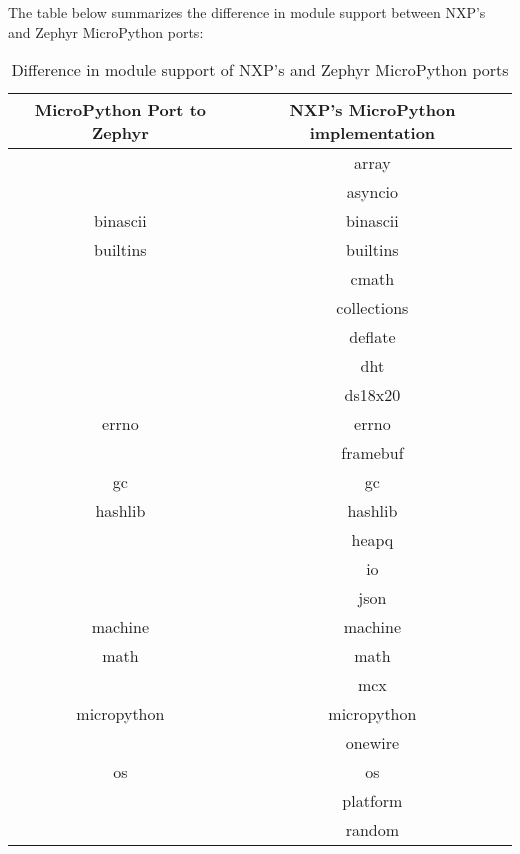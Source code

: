 \documentclass[twoside, 12pt]{article}
\begin{document}
The table below summarizes the difference in module support between NXP's and Zephyr MicroPython ports:

\begin{table}[H]
\centering
\caption{Difference in module support of NXP's and Zephyr MicroPython ports}
\label{tab:micropython-modules}
\renewcommand{\arraystretch}{1.2}
\begin{tabular}{|c|c|} \hline
\textbf{MicroPython Port to Zephyr} & \textbf{NXP's MicroPython implementation} \\ \hline
& array \\ \hline
& asyncio \\ \hline
binascii & binascii \\ \hline
builtins & builtins \\ \hline
& cmath \\ \hline
& collections \\ \hline
& deflate \\ \hline
& dht \\ \hline
& ds18x20 \\ \hline
errno & errno \\ \hline
& framebuf \\ \hline
gc & gc \\ \hline
hashlib & hashlib \\ \hline
& heapq \\ \hline
& io \\ \hline
& json \\ \hline
machine & machine \\ \hline
math & math \\ \hline
& mcx \\ \hline
micropython & micropython \\ \hline
& onewire \\ \hline
os & os \\ \hline
& platform \\ \hline
& random \\ \hline
\end{tabular}
\end{table}
\end{document}
